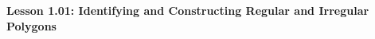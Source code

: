 \begin{center}
\textbf{Lesson 1.01: Identifying and Constructing Regular and Irregular Polygons}
\end{center}

\vspace*{-1.5ex}

